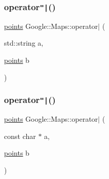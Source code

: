 \mbox{\label{a00039_ab85b8ad67a892be04acb06a1f0ea7d8f}} 
\subsubsection{\texorpdfstring{operator\texttt{"|}()}{operator|()}\hspace{0.1cm}{\footnotesize\ttfamily [4/5]}}
{\footnotesize\ttfamily \hyperlink{a00063}{points} Google\+::\+Maps\+::operator$\vert$ (\begin{DoxyParamCaption}\item[{std\+::string}]{a,  }\item[{\hyperlink{a00063}{points}}]{b }\end{DoxyParamCaption})}

\mbox{\label{a00039_a2e6cd6535efbd0d9a92d12744e614ed8}} 
\subsubsection{\texorpdfstring{operator\texttt{"|}()}{operator|()}\hspace{0.1cm}{\footnotesize\ttfamily [5/5]}}
{\footnotesize\ttfamily \hyperlink{a00063}{points} Google\+::\+Maps\+::operator$\vert$ (\begin{DoxyParamCaption}\item[{const char $\ast$}]{a,  }\item[{\hyperlink{a00063}{points}}]{b }\end{DoxyParamCaption})}

